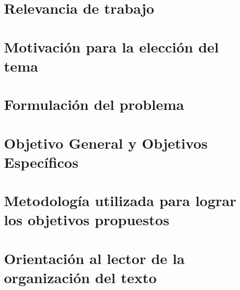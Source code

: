 \section{Relevancia de trabajo}


\section{Motivación para la elección del tema}


\section{Formulación del problema}


\section{Objetivo General y Objetivos Específicos}


\section{Metodología utilizada para lograr los objetivos propuestos}


\section{Orientación al lector de la organización del texto}